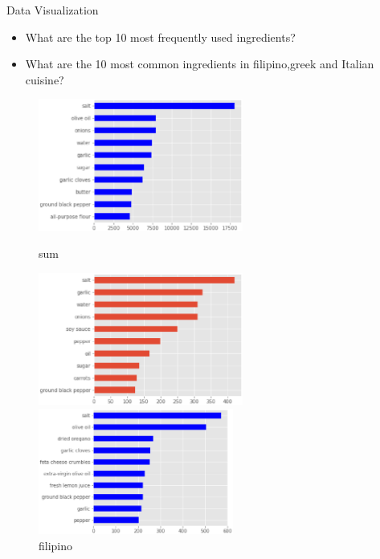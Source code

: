 \documentclass[
 size=14pt,
 paper=smartboard,  %
 mode=present, 		%
 display=slides, 	%
 style=tuliplab,  	%
 pauseslide,
 fleqn,leqno]{powerdot}
\begin{document}
\begin{slide}{Data  Visualization}
  \begin{center}

    {
      \begin{itemize}
      
        \item What are the top 10 most frequently used ingredients?
        \item What are the 10 most common ingredients in filipino,greek and Italian cuisine?
       
      \end{itemize} 
           
    
      \begin{figure}
        \centering
        \begin{minipage}[t]{0.45\textwidth}
        \centering
        \includegraphics[width=0.6\textwidth]{pic01/cooking.eps} 
        \caption{sum}
        \end{minipage}
        \begin{minipage}[t]{0.45\textwidth}
        \centering
        \includegraphics[width=0.6\textwidth]{pic01/filipino.eps}
        \caption{filipino}
        \end{minipage}
        \begin{minipage}[t]{0.45\textwidth}
        \centering
        \includegraphics[width=0.57\textwidth]{pic01/greek.eps}

\end{minipage}
\end{figure}}
\end{center}
\end{slide}
\end{document}

